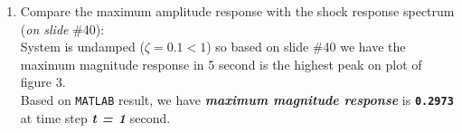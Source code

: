 \documentclass[14pt,a4paper]{article}
\begin{document}
\begin{enumerate}
	\label{Problem 3}	
	\item Compare the maximum amplitude response with the shock response spectrum (\textit{on slide} \#40):\\
	System is undamped ($\zeta = 0.1 < 1$) so based on slide \#40 we have the maximum magnitude response in 5 second is the highest peak on plot of figure 3.\\ 
	Based on \texttt{MATLAB} result, we have \textbf{\textit{maximum magnitude response}} is \textbf{\texttt{0.2973}} at time step \textbf{\textit{t = 1}} second.\\
\end{enumerate}
\end{document}
